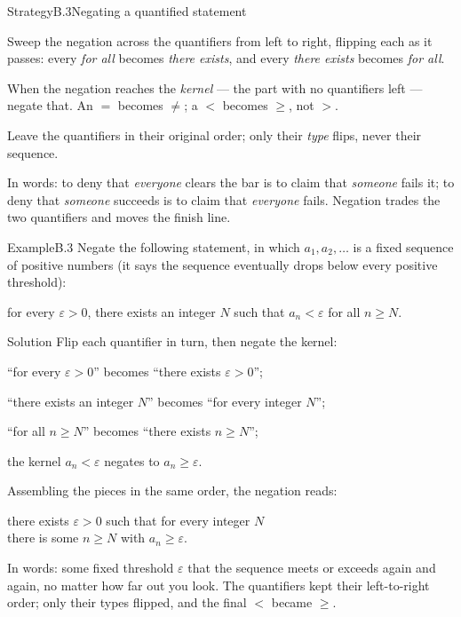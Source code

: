 \documentclass[a4paper,12pt,oneside]{memoir}
\begin{document}
\begin{envstrategy}{Strategy}{B.3}{Negating a quantified statement}
\begin{steps}
  \item Sweep the negation across the quantifiers from left to right, flipping each as it passes: every \emph{for all} becomes \emph{there exists}, and every \emph{there exists} becomes \emph{for all}.
  \item When the negation reaches the \emph{kernel} — the part with no quantifiers left — negate that. An \(=\) becomes \(\neq\); a \(<\) becomes \(\ge\), not \(>\).
  \item Leave the quantifiers in their original order; only their \emph{type} flips, never their sequence.
\end{steps}
\begin{informal}
In words: to deny that \emph{everyone} clears the bar is to claim that \emph{someone} fails it; to deny that \emph{someone} succeeds is to claim that \emph{everyone} fails. Negation trades the two quantifiers and moves the finish line.
\end{informal}
\end{envstrategy}

\begin{workedexample}
\begin{envexample}{Example}{B.3}{}
Negate the following statement, in which \(a_1, a_2, \ldots\) is a fixed sequence of positive numbers (it says the sequence eventually drops below every positive threshold):
\begin{centerstatement}
for every \(\varepsilon > 0\), there exists an integer \(N\) such that \(a_n < \varepsilon\) for all \(n \ge N\).
\end{centerstatement}
\end{envexample}
\begin{envsolution}{Solution}{}{}
Flip each quantifier in turn, then negate the kernel:
\begin{sollist}
  \item “for every \(\varepsilon > 0\)” becomes “there exists \(\varepsilon > 0\)”;
  \item “there exists an integer \(N\)” becomes “for every integer \(N\)”;
  \item “for all \(n \ge N\)” becomes “there exists \(n \ge N\)”;
  \item the kernel \(a_n < \varepsilon\) negates to \(a_n \ge \varepsilon\).
\end{sollist}
Assembling the pieces in the same order, the negation reads:
\begin{centerstatement}
there exists \(\varepsilon > 0\) such that for every integer \(N\)\\
there is some \(n \ge N\) with \(a_n \ge \varepsilon\).
\end{centerstatement}
In words: some fixed threshold \(\varepsilon\) that the sequence meets or exceeds again and again, no matter how far out you look. The quantifiers kept their left-to-right order; only their types flipped, and the final \(<\) became \(\ge\).
\end{envsolution}
\end{workedexample}
\end{document}
